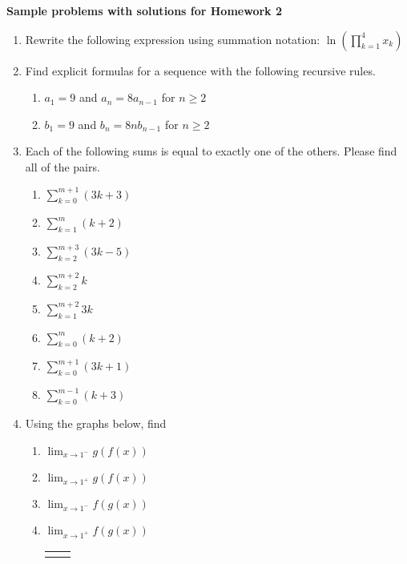 \documentclass{article}
\newcommand{\fgraff}{
\begin{minipage}[l][.30\textwidth]{3 in}{
\begin{tikzpicture}
\begin{axis}[
   	xmin=-3.25, xmax=3.25,
	ymin=-2.25, ymax=2.25,
	major tick length={0},
	xtick={-3,-2,...,3}, ytick={-2,-1,...,2},
	line width=1pt, title={\textbf{Graph of $f$}},
 	axis lines=center, height=2 in, width=3 in, grid=major,
 	restrict y to domain=-2.25:2.25
	]
	\addplot [mark=*, black, smooth, very thick] plot coordinates {(-3,2)(-2,1)};
	\addplot [mark=*, black, smooth, very thick] plot coordinates {(-2,3)};
	\addplot [mark=*, black, smooth, very thick] plot coordinates {(-2,0)(-1,1)};
	\addplot [mark=*, black, smooth, very thick] plot coordinates {(-1,2)(1,2)};
	\addplot [mark=*, black, smooth, very thick] plot coordinates {(2,-1)(3,-1)};
    \addplot [black, smooth, very thick, samples=100, domain=1:2] {(x-1)^2};
    \addplot [black, only marks, very thick, mark=*, mark options={scale=1, fill=white}]
    coordinates{(1,0) (2,1) (-1,2) (-2,1) (-2,0)};
    \addplot [black, only marks, very thick, mark=*] coordinates{(-2,2)};
\end{axis}
\end{tikzpicture}
}
\end{minipage}}
\newcommand{\ggraff}{
\begin{minipage}[l][.30\textwidth]{3 in}{
\begin{tikzpicture}
\begin{axis}[
   	xmin=-3.25, xmax=3.25,
	ymin=-2.25, ymax=2.25,
	major tick length={0},
	xtick={-3,-2,...,3}, ytick={-2,-1,...,2},
	line width=1pt, title={\textbf{Graph of $g$}},
 	axis lines=center, height=2 in, width=3 in, grid=major,
 	restrict y to domain=-2.25:2.25
	]
	\addplot [mark=*, black, smooth, very thick] plot coordinates {(-3,-1)(-1,-1)};
	\addplot [mark=*, black, smooth, very thick] plot coordinates {(1,-1)(3,1)};
	\addplot [black, very thick, mark=*, mark options={scale=1, fill=white}] plot coordinates {(-1,-2)(1,-2)};
\end{axis}
\end{tikzpicture}
}
\end{minipage}}
\begin{document}
\begin{center}
\textbf{
    Sample problems with solutions for Homework 2}
\end{center}
    \begin{enumerate}
        \item Rewrite the following expression using summation notation:
        $\ln\left(\prod_{k=1}^4 x_k\right)$
        \item Find explicit formulas for a sequence with the following recursive rules.
        \begin{enumerate}
            \item $a_1 = 9$ and $a_n = 8a_{n-1}$ for $n \geq 2$

            \item $b_1 = 9$ and $b_n = 8nb_{n-1}$ for $n \geq 2$
        \end{enumerate}
        
        \item Each of the following sums is equal to exactly one of the others. Please find all of the pairs.
        \begin{enumerate}[label=(\alph*)]
            \item $\sum_{k=0}^{m+1} (3k+3)$
            \item $\sum_{k=1}^m (k+2)$
            \item $\sum_{k=2}^{m+3} (3k-5)$
            \item $\sum_{k=2}^{m+2} k$
            \item $\sum_{k=1}^{m+2} 3k$
            \item $\sum_{k=0}^{m} (k+2)$
            \item $\sum_{k=0}^{m+1} (3k+1)$
            \item $\sum_{k=0}^{m-1}(k+3)$
        \end{enumerate}
        \item Using the graphs below, find 
        \begin{enumerate}

            \item $\displaystyle \lim_{x\rightarrow 1^-} g(f(x))$
            \item $\lim_{x\rightarrow 1^+} g(f(x))$ 
            \item $\lim_{x\rightarrow 1^-} f(g(x))$
            \item $\lim_{x\rightarrow 1^+} f(g(x))$ 
                               \begin{center}
                    \begin{tabular}{l r}
                    \fgraff & \ggraff
                    \end{tabular}
                    \end{center}
        \end{enumerate}
    \end{enumerate}
    
\end{document}
